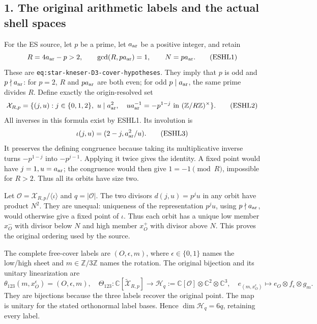 \documentclass[
  10pt,
  a4paper,
]{article}
\begin{document}
\subsection{1. The original arithmetic labels and the actual shell
spaces}\label{the-original-arithmetic-labels-and-the-actual-shell-spaces}

For the ES source, let \(p\) be a prime, let \(a_{\rm ar}\) be a
positive integer, and retain \[
R=4a_{\rm ar}-p>2,\qquad\gcd(R,pa_{\rm ar})=1,
\qquad N=pa_{\rm ar}.
\tag{ESHL1}
\] These are \texttt{eq:\allowbreak{}star-\allowbreak{}kneser-\allowbreak{}D3-\allowbreak{}cover-\allowbreak{}hypotheses}. They imply
that \(p\) is odd and \(p\nmid a_{\rm ar}\): for \(p=2\), \(R\) and
\(pa_{\rm ar}\) are both even; for odd \(p\mid a_{\rm ar}\), the same
prime divides \(R\). Define exactly the origin-resolved set \[
\mathcal X_{R,p}=
\{(j,u):j\in\{0,1,2\},\ u\mid a_{\rm ar}^2,
\quad u a_{\rm ar}^{-1}=-p^{1-j}\text{ in }(\mathbb Z/R\mathbb Z)^\times\}.
\tag{ESHL2}
\] All inverses in this formula exist by ESHL1. Its involution is \[
\iota(j,u)=(2-j,a_{\rm ar}^2/u).
\tag{ESHL3}
\] It preserves the defining congruence because taking its
multiplicative inverse turns \(-p^{1-j}\) into \(-p^{j-1}\). Applying it
twice gives the identity. A fixed point would have \(j=1,u=a_{\rm ar}\);
the congruence would then give \(1=-1\pmod R\), impossible for \(R>2\).
Thus all its orbits have size two.

Let \(\mathcal O=\mathcal X_{R,p}/\langle\iota\rangle\) and
\(q=|\mathcal O|\). The two divisors \(d(j,u)=p^ju\) in any orbit have
product \(N^2\). They are unequal: uniqueness of the representation
\(p^ju\), using \(p\nmid a_{\rm ar}\), would otherwise give a fixed
point of \(\iota\). Thus each orbit has a unique low member \(x_O^-\)
with divisor below \(N\) and high member \(x_O^+\) with divisor above
\(N\). This proves the original ordering used by the source.

The complete free-cover labels are \((O,\epsilon,m)\), where
\(\epsilon\in\{0,1\}\) names the low/high sheet and
\(m\in\mathbb Z/3\mathbb Z\) names the rotation. The original bijection
and its unitary linearization are \[
\theta_{123}(m,x_O^\epsilon)=(O,\epsilon,m),
\quad
\Theta_{123}:\mathbb C[\widetilde{\mathcal X}_{R,p}]
\longrightarrow \mathcal H_q:=\mathbb C[\mathcal O]\otimes\mathbb C^2\otimes\mathbb C^3,
\quad e_{(m,x_O^\epsilon)}\mapsto e_O\otimes f_\epsilon\otimes g_m.
\tag{ESHL4}
\] They are bijections because the three labels recover the original
point. The map is unitary for the stated orthonormal label bases. Hence
\(\dim\mathcal H_q=6q\), retaining every label.
\end{document}
